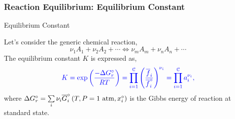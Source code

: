 \documentclass[10pt,compress,handout,unknownkeysallowed]{beamer}
\begin{document}
\begin{frame}
  \frametitle{Reaction Equilibrium: Equilibrium Constant}
      \begin{block}{\begin{center}Equilibrium Constant\end{center}}
            Let's consider the generic chemical reaction,
               \begin{displaymath}
                   \nu_{1} A_{1} + \nu_{2} A_{2}  + \cdots  \Longleftrightarrow \nu_{m} A_{m} + \nu_{n} A_{n} + \cdots  
               \end{displaymath} 
            The equilibrium constant $K$ is expressed as,
               \begin{displaymath}
                  \blue{K = \exp\left(\frc{-\Delta G_{r}^{\circ}}{RT}\right) = \prod\limits_{i=1}^{\mathcal{C}}\left(\frc{\overline{f}_{i}}{\overline{f}_{i}^{\circ}}\right)^{\nu_{i}} = \prod\limits_{i=1}^{\mathcal{C}} a_{i}^{\nu_{i}},}
               \end{displaymath}
               where $\Delta G_{r}^{\circ}=\summation[\nu_{i}\overline{G}_{i}^{\circ}\left(T,P=1\text{ atm}, x_{i}^{\circ}\right)]{i}{}$ is the Gibbs energy of reaction at standard state.
      \end{block}

\end{frame}
\end{document}
